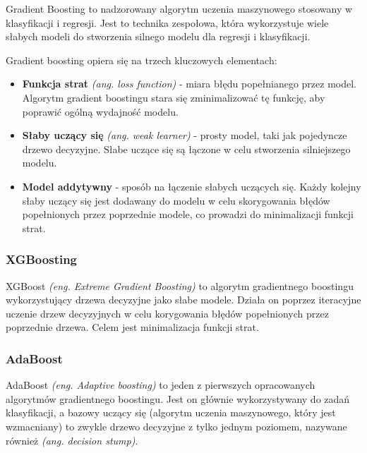 \documentclass[12pt,a4paper]{article}
\begin{document}
Gradient Boosting to nadzorowany algorytm uczenia maszynowego stosowany w klasyfikacji i regresji. Jest to technika zespołowa, która wykorzystuje wiele słabych modeli do stworzenia silnego modelu dla regresji i klasyfikacji. \cite{gradient-boosting}


Gradient boosting opiera się na trzech kluczowych elementach:
\begin{itemize}
 \item \textbf{Funkcja strat} \textit{(ang. loss function)} -  miara błędu popełnianego przez model. Algorytm gradient boostingu stara się zminimalizować tę funkcję, aby poprawić ogólną wydajność modelu.
 
 \item \textbf{Słaby uczący się} \textit{(ang. weak learner)} - prosty model, taki jak pojedyncze drzewo decyzyjne. Słabe uczące się są łączone w celu stworzenia silniejszego modelu.
 
 \item \textbf{Model addytywny} - sposób na łączenie słabych uczących się. Każdy kolejny słaby uczący się jest dodawany do modelu w celu skorygowania błędów popełnionych przez poprzednie modele, co prowadzi do minimalizacji funkcji strat.
\end{itemize}

\subsubsection{XGBoosting}
\label{sec:xgboosting}
XGBoost \textit{(eng. Extreme Gradient Boosting)} \cite{xg-boost} to algorytm gradientnego boostingu wykorzystujący drzewa decyzyjne jako słabe modele. Działa on poprzez iteracyjne uczenie drzew decyzyjnych w celu korygowania błędów popełnionych przez poprzednie drzewa. Celem jest minimalizacja funkcji strat.

\subsubsection{AdaBoost}
\label{sec:adaboosting}
AdaBoost \textit{(eng. Adaptive boosting)} to jeden z pierwszych opracowanych algorytmów gradientnego boostingu. Jest on głównie wykorzystywany do zadań klasyfikacji, a bazowy uczący się (algorytm uczenia maszynowego, który jest wzmacniany) to zwykle drzewo decyzyjne z tylko jednym poziomem, nazywane również \textit{(ang. decision stump)}. \cite{adaboost}
\end{document}
